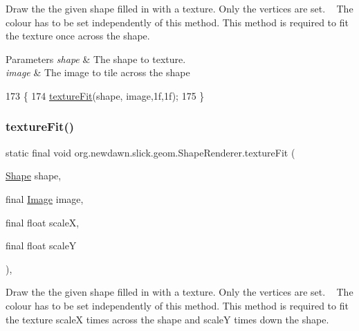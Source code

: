 Draw the the given shape filled in with a texture. Only the vertices are set. ~\newline
The colour has to be set independently of this method. This method is required to fit the texture once across the shape.


\begin{DoxyParams}{Parameters}
{\em shape} & The shape to texture. \\
\hline
{\em image} & The image to tile across the shape \\
\hline
\end{DoxyParams}

\begin{DoxyCode}
173                                                                   \{
174         \mbox{\hyperlink{classorg_1_1newdawn_1_1slick_1_1geom_1_1_shape_renderer_ad6d48583699bfb39ff6d17decbd03634}{textureFit}}(shape, image,1f,1f);
175     \}
\end{DoxyCode}
\mbox{\label{classorg_1_1newdawn_1_1slick_1_1geom_1_1_shape_renderer_a54f85a9dc90925fb89b2fffccdbd1b83}} 
\subsubsection{\texorpdfstring{texture\+Fit()}{textureFit()}\hspace{0.1cm}{\footnotesize\ttfamily [2/2]}}
{\footnotesize\ttfamily static final void org.\+newdawn.\+slick.\+geom.\+Shape\+Renderer.\+texture\+Fit (\begin{DoxyParamCaption}\item[{\mbox{\hyperlink{classorg_1_1newdawn_1_1slick_1_1geom_1_1_shape}{Shape}}}]{shape,  }\item[{final \mbox{\hyperlink{classorg_1_1newdawn_1_1slick_1_1_image}{Image}}}]{image,  }\item[{final float}]{scaleX,  }\item[{final float}]{scaleY }\end{DoxyParamCaption})\hspace{0.3cm}{\ttfamily [inline]}, {\ttfamily [static]}}

Draw the the given shape filled in with a texture. Only the vertices are set. ~\newline
The colour has to be set independently of this method. This method is required to fit the texture scaleX times across the shape and scaleY times down the shape.


